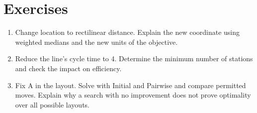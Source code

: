 \section{Exercises}
\begin{enumerate}
\item Change location to rectilinear distance. Explain the new coordinate
      using weighted medians and the new units of the objective.
\item Reduce the line's cycle time to 4. Determine the minimum number of
      stations and check the impact on efficiency.
\item Fix A in the layout. Solve with Initial and Pairwise and compare
      permitted moves. Explain why a search with no improvement does not
      prove optimality over all possible layouts.
\end{enumerate}
